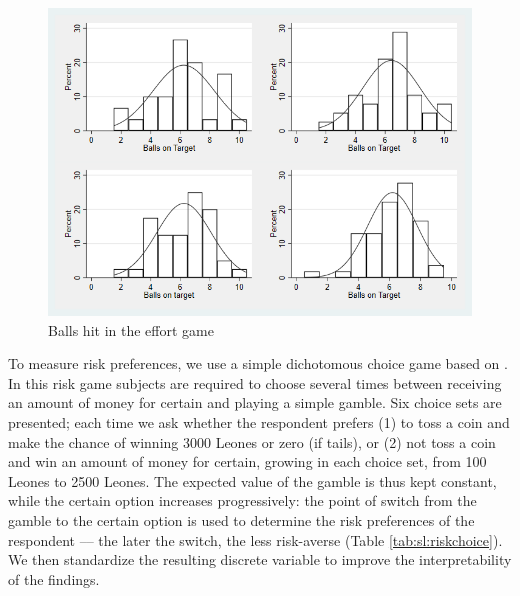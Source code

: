 \begin{figure}[htb]
  \includegraphics[width=0.8\linewidth]{"chapters/slfootball/figures/f3_ballshit.png"}
  \caption{Balls hit in the effort game}
  \label{fig:slf:ballshit}
\end{figure}

To measure risk preferences, we use a simple dichotomous choice game based on \cite{Harbaugh2002a}. In this risk game subjects are required to choose several times between receiving an amount of money for certain and playing a simple gamble. Six choice sets are presented; each time we ask whether the respondent prefers (1) to toss a coin and make the chance of winning 3000 Leones or zero (if tails), or (2) not toss a coin and win an amount of money for certain, growing in each choice set, from 100 Leones to 2500 Leones. The expected value of the gamble is thus kept constant, while the certain option increases progressively: the point of switch from the gamble to the certain option is used to determine the risk preferences of the respondent \citep[see][]{Harbaugh2002a} –– the later the switch, the less risk-averse (Table \ref{tab:sl:riskchoice}). We then standardize the resulting discrete variable to improve the interpretability of the findings.


